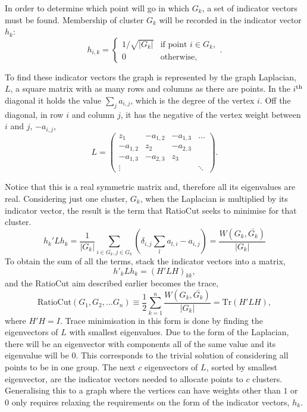 In order to determine which point will go in which \(G_k\), a set of indicator vectors must be found.
Membership of cluster \(G_k\) will be recorded in the indicator vector \(h_k\):
\begin{equation}
    h_{i, k}= 
    \begin{cases}
        1/\sqrt{|G_k|}& \text{if point } i \in G_k ,\\
        0             & \text{otherwise},
    \end{cases}
    .
\end{equation}

To find these indicator vectors the graph is represented by the graph Laplacian, $L$, a square
matrix with as many rows and columns as there are points.
In the \(i\)$^{\rm th}$ diagonal it holds the value \(\sum_j a_{i, j}\),
which is the degree of the vertex \(i\).
Off the diagonal, in row \(i\) and column \(j\), it has the negative of the vertex weight between \(i\) and \(j\), \(-a_{i, j}\),
\begin{equation}\label{eqn:unnormed_laplacian}
    L = 
    \begin{pmatrix}
        z_1 & -a_{1,2} & -a_{1,3} & \hdots \\
        -a_{1,2} & z_2 & -a_{2,3} & \\
        -a_{1,3} & -a_{2,3} & z_3 & \\
        \vdots   &          &     & \ddots 
    \end{pmatrix}.
\end{equation}

Notice that this is a real symmetric matrix
and, therefore all its eigenvalues are real.
Considering just one cluster, \(G_k\), when the Laplacian is multiplied by its indicator vector,
the result is the term that RatioCut seeks to minimise for that cluster.
\begin{equation}
    h_k'Lh_k = \frac{1}{|G_k|}\sum_{i \in G_k, j \in G_k} \left(\delta_{i, j}\sum_{l} a_{l, i} - a_{i, j} \right) = \frac{W(G_k, \bar{G_k})}{|G_k|}
\end{equation}
To obtain the sum of all the terms, stack the indicator vectors into a matrix,
\begin{equation} h'_k L h_k = (H'L H)_{kk},\end{equation}
and the RatioCut aim described earlier becomes the trace,
\begin{equation} \text{RatioCut}(G_1,G_2, \dots G_n) \equiv \frac{1}{2} \sum_{k=1}^n \frac{W(G_k, \bar{G_k})}{|G_k|} = \text{Tr}(H'LH),\end{equation}
where \(H'H = I\).
Trace minimisation in this form is done
by finding the eigenvectors of \(L\) with smallest 
eigenvalues.
Due to the form of the Laplacian, there will be an eigenvector with components all of the same value and its eigenvalue will be \(0\).
This corresponds to the trivial solution of considering all points to be in one group.
The next \(c\) eigenvectors of \(L\), sorted by smallest eigenvector, are the indicator vectors needed to allocate points to \(c\) clusters.
Generalising this to a graph where the vertices can have weights other than \(1\) or \(0\)
only requires relaxing the requirements on the form of the indicator vectors, \(h_k\).

